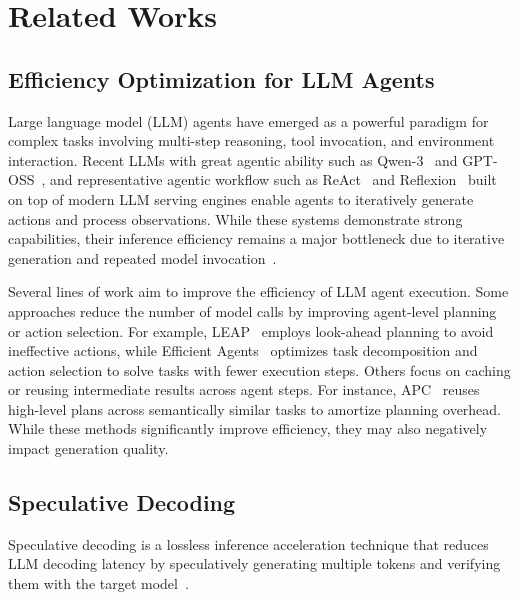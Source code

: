 \section{Related Works}
\label{sec:related_works}

\subsection{Efficiency Optimization for LLM Agents}
\label{subsec:efficiency_optimization_for_llm_agents}
Large language model (LLM) agents have emerged as a powerful paradigm for complex tasks involving multi-step reasoning, tool invocation, and environment interaction. Recent LLMs with great agentic ability such as Qwen-3~\citep{DBLP:journals/corr/abs-2505-09388} and GPT-OSS~\citep{DBLP:journals/corr/abs-2508-10925}, and representative agentic workflow such as ReAct~\citep{DBLP:conf/iclr/YaoZYDSN023} and Reflexion~\citep{DBLP:conf/nips/ShinnCGNY23} built on top of modern LLM serving engines enable agents to iteratively generate actions and process observations. While these systems demonstrate strong capabilities, their inference efficiency remains a major bottleneck due to iterative generation and repeated model invocation~\citep{DBLP:journals/corr/abs-2508-02694, DBLP:journals/corr/abs-2502-13965}.

Several lines of work aim to improve the efficiency of LLM agent execution.
Some approaches reduce the number of model calls by improving agent-level planning or action selection. For example, LEAP~\citep{verma-bharadwaj-2025-leap} employs look-ahead planning to avoid ineffective actions, while Efficient Agents~\citep{DBLP:journals/corr/abs-2508-02694} optimizes task decomposition and action selection to solve tasks with fewer execution steps.
Others focus on caching or reusing intermediate results across agent steps. For instance, APC~\citep{zhang2025agentic} reuses high-level plans across semantically similar tasks to amortize planning overhead. While these methods significantly improve efficiency, they may also negatively impact generation quality.


\subsection{Speculative Decoding}
\label{subsec:specualtive_decoding}
Speculative decoding is a lossless inference acceleration technique that reduces LLM decoding latency by speculatively generating multiple tokens and verifying them with the target model~\citep{DBLP:conf/acl/XiaYDW00L0S24}.

